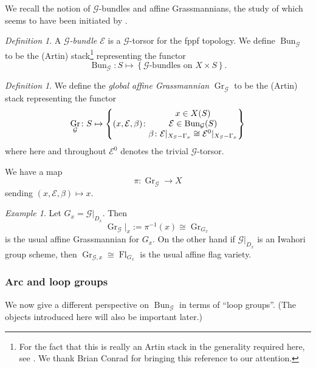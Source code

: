 \documentclass[reqno]{amsart}
\numberwithin{equation}{section}
\newcommand{\Cal}[1]{\mathcal{#1}}
\newcommand{\co}{\colon}
\DeclareMathOperator{\Bun}{Bun}
\DeclareMathOperator{\Gr}{Gr}
\DeclareMathOperator{\Fl}{Fl}
\theoremstyle{remark}
\newtheorem{defn}[thm]{Definition}
\newtheorem{example}[thm]{Example}
\numberwithin{equation}{section}
\begin{document}
\subsubsection{} We recall the notion of $\Cal{G}$-bundles and affine Grassmannians, the study of which seems to have been initiated by \cite{PR10}. 


\begin{defn}
A \emph{$\Cal{G}$-bundle $\Cal{E}$} is a $\Cal{G}$-torsor for the fppf topology. We define  $\Bun_{\Cal{G}}$ to be the (Artin) stack\footnote{For the fact that this is really an Artin stack in the generality required here, see \cite{Bro13}. We thank Brian Conrad for bringing this reference to our attention.} representing the functor 
\[
\Bun_{\Cal{G}} \colon S \mapsto \left\{ \text{$\Cal{G}$-bundles on $X \times S$}\right\}   .
\]
\end{defn}

\begin{defn} We define the \emph{global affine Grassmannian} $\Gr_{\Cal{G}}$ to be the (Artin) stack representing the functor
\[
\Gr_{\Cal{G}} \colon S \mapsto \left\{ (x,\Cal{E} , \beta)  \colon  \begin{array}{@{}c@{}} 
x \in X(S) \\
  \Cal{E} \in \Bun_{\Cal{G}}(S)  \\
  \beta \co \Cal{E}|_{X_S - \Gamma_x} \cong \Cal{E}^0 |_{X_S-\Gamma_x} \\ 
 \end{array} \right\}   
\]
where here and throughout $\Cal{E}^0$ denotes the  trivial $\Cal{G}$-torsor. 
\end{defn}


We have a map 
\[
\pi \co \Gr_{\Cal{G}} \rightarrow X
\]
sending $(x,\Cal{E} , \beta)  \mapsto x$.


\begin{example}
Let $G_x = \Cal{G}|_{D_x}$. Then
\[
\Gr_{\Cal{G}}|_x	 := \pi^{-1}(x) \cong \Gr_{G_x}
\]
is the usual affine Grassmannian for $G_x$. On the other hand if $\Cal{G}|_{D_x}$ is an Iwahori group scheme, then $\Gr_{\Cal{G},x}  \cong \Fl_{G_x}$ is the usual 
affine flag variety.
\end{example}

\subsubsection{Arc and loop groups} We now give a different perspective on $\Bun_{\Cal{G}}$ in terms of ``loop groups''. (The objects introduced here will also be important later.)
\end{document}
